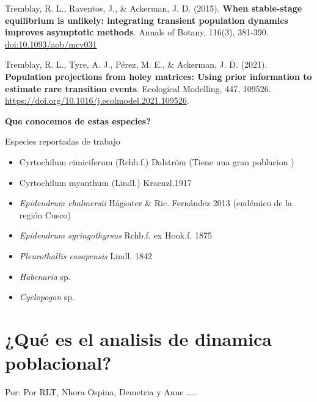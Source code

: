 \documentclass[
]{book}
\theoremstyle{definition}
\theoremstyle{definition}
\theoremstyle{definition}
\theoremstyle{definition}
\theoremstyle{remark}
\begin{document}
Tremblay, R. L., Raventos, J., \& Ackerman, J. D. (2015). \textbf{When
stable-stage equilibrium is unlikely: integrating transient population
dynamics improves asymptotic methods}. Annals of Botany, 116(3),
381-390. \url{doi:10.1093/aob/mcv031}

Tremblay, R. L., Tyre, A. J., Pérez, M. E., \& Ackerman, J. D. (2021).
\textbf{Population projections from holey matrices: Using prior information to
estimate rare transition events}. Ecological Modelling, 447, 109526.
\url{https://doi.org/10.1016/j.ecolmodel.2021.109526}.

\textbf{Que conocemos de estas especies?}

Especies reportadas de trabajo

\begin{itemize}
\item
  Cyrtochilum cimiciferum (Rchb.f.) Dalström (Tiene una gran poblacion
  )
\item
  Cyrtochilum myanthum (Lindl.) Kraenzl.1917
\item
  \emph{Epidendrum chalmersii} Hágsater \& Ric. Fernández 2013 (endémico de
  la región Cusco)
\item
  \emph{Epidendrum syringothyrsus} Rchb.f. ex Hook.f. 1875
\item
  \emph{Pleurothallis casapensis} Lindl. 1842
\item
  \emph{Habenaria} sp.
\item
  \emph{Cyclopogon} sp.
\end{itemize}

\hypertarget{quuxe9-es-el-analisis-de-dinamica-poblacional}{%
\chapter{¿Qué es el analisis de dinamica poblacional?}\label{quuxe9-es-el-analisis-de-dinamica-poblacional}}

Por: Por RLT, Nhora Ospina, Demetria y Anne \ldots..
\end{document}
